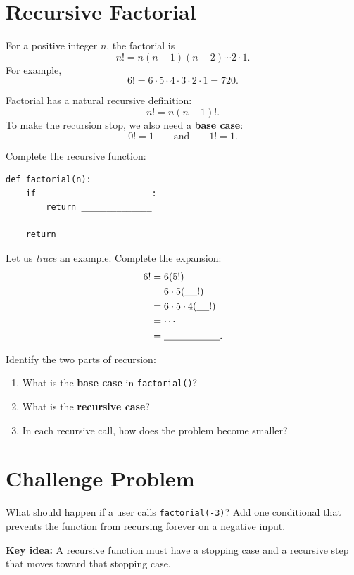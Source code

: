 \documentclass[11pt]{article}
\begin{document}
\section{Recursive Factorial}
For a positive integer \(n\), the factorial is
\[
n! = n(n-1)(n-2)\cdots 2\cdot 1.
\]
For example,
\[
6! = 6\cdot5\cdot4\cdot3\cdot2\cdot1 = 720.
\]

Factorial has a natural recursive definition:
\[
n! = n(n-1)!.
\]
To make the recursion stop, we also need a \textbf{base case}:
\[
0! = 1 \qquad \text{and} \qquad 1! = 1.
\]

Complete the recursive function: \\
\begin{lstlisting}
def factorial(n):
    if ______________________:
        return ______________

    return ___________________
\end{lstlisting}\vspace{0.25cm}

Let us \textit{trace} an example.  Complete the expansion:
\[
\begin{aligned}
6! &= 6(5!)\\
   &= 6\cdot5(\underline{\hspace{0.45cm}}!)\\
   &= 6\cdot5\cdot4(\underline{\hspace{0.45cm}}!)\\
   &= \cdots\\
   &= \underline{\hspace{2.0cm}}.
\end{aligned}
\]

Identify the two parts of recursion:

\begin{enumerate}
\item What is the \textbf{base case} in \texttt{factorial()}?
\item What is the \textbf{recursive case}?
\item In each recursive call, how does the problem become smaller?
\end{enumerate}

\section{Challenge Problem}

What should happen if a user calls \texttt{factorial(-3)}? Add one conditional that prevents the function from recursing forever on a negative input.

\vfill
\small\textbf{Key idea:} A recursive function must have a stopping case
and a recursive step that moves toward that stopping case.
\end{document}
